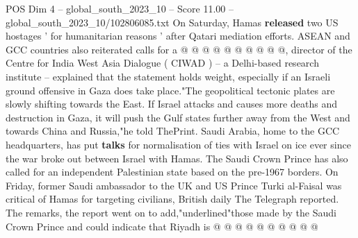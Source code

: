 \begin{textsample}{POS Dim 4 – global\_south\_2023\_10 – Score 11.00 – global\_south\_2023\_10/102806085.txt}
On Saturday, Hamas \textbf{released} two US hostages ' for humanitarian reasons ' after Qatari mediation efforts.
ASEAN and GCC countries also reiterated calls for a @ @ @ @ @ @ @ @ @ @, director of the Centre for India West Asia Dialogue ( CIWAD ) -- a Delhi-based research institute -- explained that the statement holds weight, especially if an Israeli ground offensive in Gaza does take place."The geopolitical tectonic plates are slowly shifting towards the East.
If Israel attacks and causes more deaths and destruction in Gaza, it will push the Gulf states further away from the West and towards China and Russia,"he told ThePrint.
Saudi Arabia, home to the GCC headquarters, has put \textbf{talks} for normalisation of ties with Israel on ice ever since the war broke out between Israel with Hamas.
The Saudi Crown Prince has also called for an independent Palestinian state based on the pre-1967 borders.
On Friday, former Saudi ambassador to the UK and US Prince Turki al-Faisal was critical of Hamas for targeting civilians, British daily The Telegraph reported.
The remarks, the report went on to add,"underlined"those made by the Saudi Crown Prince and could indicate that Riyadh is @ @ @ @ @ @ @ @ @ @

\end{textsample}
